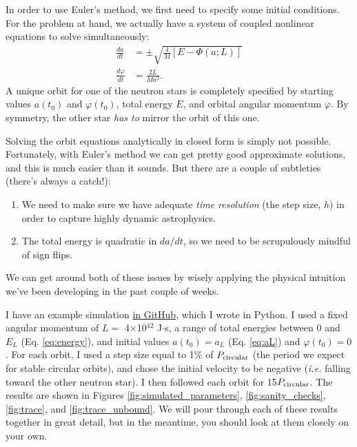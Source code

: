 \documentclass[11pt]{article}
\begin{document}
\begin{enumerate}
\hspace{15pt} In order to use Euler's method, we first need to specify some initial conditions. For the problem at hand, we actually have a system of coupled nonlinear equations to solve simultaneously:
\begin{align*}
\frac{da}{dt} &= \pm \sqrt{ \frac{4}{M} \left[ E - \Phi(a; L) \right] } \\
\frac{d\varphi}{dt} &= \frac{2L}{Ma^2}.
\end{align*}
A unique orbit for one of the neutron stars is completely specified by starting values $a(t_0)$ and $\varphi(t_0)$, total energy $E$, and orbital angular momentum $\varphi$. By symmetry, the other star \emph{has to} mirror the orbit of this one.

\hspace{2pt} Solving the orbit equations analytically in closed form is simply not possible. Fortunately, with Euler's method we can get pretty good approximate solutions, and this is much easier than it sounds. But there are a couple of subtleties (there's always a catch!):
\begin{enumerate}
\item We need to make sure we have adequate \textit{time resolution} (the step size, $h$) in order to capture highly dynamic astrophysics.

\item The total energy is quadratic in $da/dt$, so we need to be scrupulously mindful of sign flips.
\end{enumerate}
We can get around both of these issues by wisely applying the physical intuition we've been developing in the past couple of weeks.

\hspace{15pt}I have an example simulation \href{https://github.com/alurban/mentoring/blob/master/tidal_distortion/scripts/kepler_orbits.py}{in GitHub}, which I wrote in Python. I used a fixed angular momentum of $L=$ 4$\times$10$^{42}$ J$\cdot$s, a range of total energies between 0 and $E_L$ (Eq. \ref{eq:energy}), and initial values $a(t_0) = a_L$ (Eq. \ref{eq:aL}) and $\varphi(t_0) = 0$. For each orbit, I used a step size equal to 1\% of $P_{\rm circular}$ (the period we expect for stable circular orbits), and chose the initial velocity to be negative (\textit{i.e.} falling toward the other neutron star). I then followed each orbit for 15$P_{\rm circular}$. The results are shown in Figures \ref{fig:simulated_parameters}, \ref{fig:sanity_checks}, \ref{fig:trace}, and \ref{fig:trace_unbound}. We will pour through each of these results together in great detail, but in the meantime, you should look at them closely on your own.

\end{enumerate}
\end{document}
